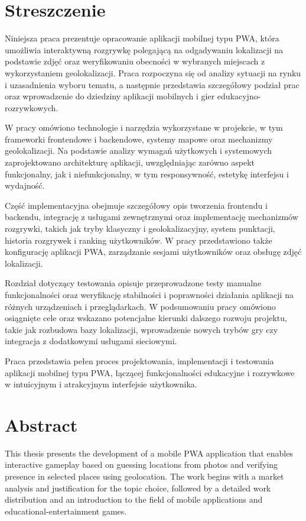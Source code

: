\chapter*{Streszczenie}
Niniejsza praca prezentuje opracowanie aplikacji mobilnej typu PWA, która umożliwia interaktywną rozgrywkę polegającą na odgadywaniu lokalizacji na podstawie zdjęć oraz weryfikowaniu obecności w wybranych miejscach z wykorzystaniem geolokalizacji. Praca rozpoczyna się od analizy sytuacji na rynku i uzasadnienia wyboru tematu, a następnie przedstawia szczegółowy podział prac oraz wprowadzenie do dziedziny aplikacji mobilnych i gier edukacyjno-rozrywkowych.

W pracy omówiono technologie i narzędzia wykorzystane w projekcie, w tym frameworki frontendowe i backendowe, systemy mapowe oraz mechanizmy geolokalizacji. Na podstawie analizy wymagań użytkowych i systemowych zaprojektowano architekturę aplikacji, uwzględniając zarówno aspekt funkcjonalny, jak i niefunkcjonalny, w tym responsywność, estetykę interfejsu i wydajność.

Część implementacyjna obejmuje szczegółowy opis tworzenia frontendu i backendu, integrację z usługami zewnętrznymi oraz implementację mechanizmów rozgrywki, takich jak tryby klasyczny i geolokalizacyjny, system punktacji, historia rozgrywek i ranking użytkowników. W pracy przedstawiono także konfigurację aplikacji PWA, zarządzanie sesjami użytkowników oraz obsługę zdjęć lokalizacji.

Rozdział dotyczący testowania opisuje przeprowadzone testy manualne funkcjonalności oraz weryfikację stabilności i poprawności działania aplikacji na różnych urządzeniach i przeglądarkach. W podsumowaniu pracy omówiono osiągnięte cele oraz wskazano potencjalne kierunki dalszego rozwoju projektu, takie jak rozbudowa bazy lokalizacji, wprowadzenie nowych trybów gry czy integracja z dodatkowymi usługami sieciowymi.

Praca przedstawia pełen proces projektowania, implementacji i testowania aplikacji mobilnej typu PWA, łączącej funkcjonalności edukacyjne i rozrywkowe w intuicyjnym i atrakcyjnym interfejsie użytkownika.

\chapter*{Abstract}
This thesis presents the development of a mobile PWA application that enables interactive gameplay based on guessing locations from photos and verifying presence in selected places using geolocation. The work begins with a market analysis and justification for the topic choice, followed by a detailed work distribution and an introduction to the field of mobile applications and educational-entertainment games.

